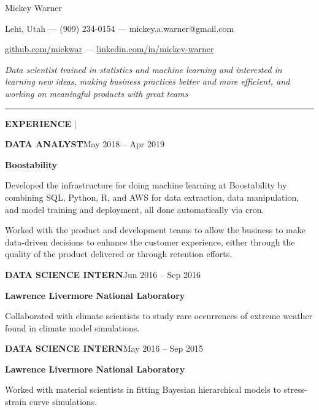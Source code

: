 \documentclass[12pt]{article}
\newcommand{\entrypar}[5]{
    \textbf{\MakeUppercase{#1}}\hfill #3 -- #4

    \textbf{#2}

    #5
    }
\begin{document}

\begin{center}
\begin{Huge}
Mickey Warner
\end{Huge}
\end{center}

\hspace{85pt} Lehi, Utah --- (909) 234-0154 --- mickey.a.warner@gmail.com

\hspace{85pt} \href{https://www.github.com/mickwar}{github.com/mickwar} --- \href{https://www.linkedin.com/in/mickey-warner/}{linkedin.com/in/mickey-warner}
\smallskip
\smallskip
\smallskip
\smallskip
\smallskip

\emph{Data scientist trained in statistics and machine learning and interested in learning new ideas, making business practices better and more efficient, and working on meaningful products with great teams    }
\smallskip

\hrule

\bigskip


\begin{minipage}[t]{0.19\textwidth}
    \begin{flushright}
        \textbf{EXPERIENCE} $\vert$ \ \
    \end{flushright}
\end{minipage}%
%
\begin{minipage}[t]{0.81\textwidth}
    \begin{flushleft}
        \entrypar{Data analyst}{Boostability}{May 2018}{Apr 2019}{
Developed the infrastructure for doing machine learning at Boostability by combining SQL, Python, R, and AWS for data extraction, data manipulation, and model training and deployment, all done automatically via cron.
\bigskip

Worked with the product and development teams to allow the business to make data-driven decisions to enhance the customer experience, either through the quality of the product delivered or through retention efforts.
        }

        \bigskip

        \entrypar{Data science intern}{Lawrence Livermore National Laboratory}{Jun 2016}{Sep 2016}{
Collaborated with climate scientists to study rare occurrences of extreme weather found in climate model simulations.
        }
        \bigskip

        \entrypar{Data science intern}{Lawrence Livermore National Laboratory}{May 2016}{Sep 2015}{
Worked with material scientists in fitting Bayesian hierarchical models to stress-strain curve simulations.
        }
    \end{flushleft}
\end{minipage}
\end{document}
